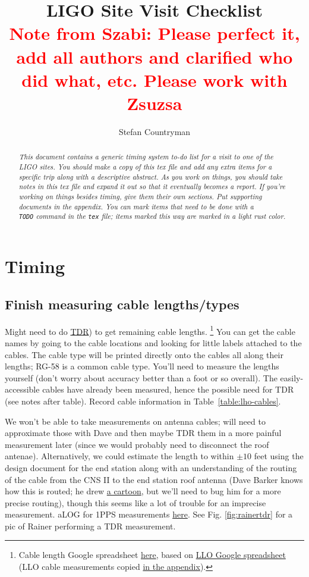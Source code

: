 \documentclass{article}
\author{Stefan Countryman}
\title{LIGO Site Visit Checklist\\
\textcolor{red}{{\bf Note from Szabi:} Please perfect it, add all authors and clarified who did what, etc. Please work with Zsuzsa}}
\newcommand*{\TODO}{\textcolor{todo}}
\begin{document}
\maketitle

\begin{abstract}
\emph{This document contains a generic timing system to-do list for a visit to one of the LIGO sites. You should make a copy of this tex file and add any extra items for a specific trip along with a descriptive abstract. As you work on things, you should take notes in this tex file and expand it out so that it eventually becomes a report. If you're working on things besides timing, give them their own sections. Put supporting documents in the appendix. You can mark items that need to be done with a \texttt{\\TODO} command in the \texttt{tex} file; items marked this way are \TODO{marked in a light rust color}.}
\end{abstract}

\section{Timing}

\TODO{
\subsection{\label{sec:cable-lengths}Finish measuring cable lengths/types}
}
Might need to do 
\href{https://en.wikipedia.org/wiki/Time-domain_reflectometer}{TDR})
to get remaining cable lengths.
\footnote{
    Cable length Google spreadsheet \href{https://docs.google.com/spreadsheets/d/1cjpBtpd4oPAfjNjBhE3RXxSx3ma3oopqLLZFMjEjc0w/edit\#gid=0}{here}, based on \href{https://docs.google.com/spreadsheets/d/1AfZ9m7Qetefmtr-PnHNARC14OWaPfn0z5c9GOvcojyA/edit\#gid=0}{LLO Google spreadsheet} (LLO cable measurements copied \hyperref[sec:llocables]{in the appendix}).
}
You can get the cable names by going to the cable locations and looking for little labels attached to the cables. The cable type will be printed directly onto the cables all along their lengths; RG-58 is a common cable type. You'll need to measure the lengths yourself (don't worry about accuracy better than a foot or so overall). The easily-accessible cables have already been measured, hence the possible need for TDR (see notes after table).
Record cable information in Table~\ref{table:lho-cables}.

We won't be able to take measurements on antenna cables; will need to approximate those with Dave and then maybe TDR them in a more painful measurement later (since we would probably need to disconnect the roof antenae). Alternatively, we could estimate the length to within $\pm10$ feet using the design document for the end station along with an understanding of the routing of the cable from the CNS II to the end station roof antenna (Dave Barker knows how this is routed; he drew 
\hyperref[fig:routing]{a cartoon}, but we'll need to bug him for a more precise routing), though this seems like a lot of trouble for an imprecise measurement. aLOG for 1PPS measurements 
\href{https://alog.ligo-wa.caltech.edu/aLOG/index.php?callRep=43185}{here}. See Fig. \ref{fig:rainertdr} for a pic of Rainer performing a TDR measurement.
\end{document}
